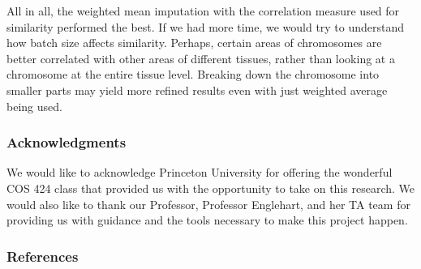 \documentclass{article} %
\begin{document}
All in all, the weighted mean imputation with the correlation measure used for similarity performed the best. If we had more time, we would try to understand how batch size affects similarity. Perhaps, certain areas of chromosomes are better correlated with other areas of different tissues, rather than looking at a chromosome at the entire tissue level. Breaking down the chromosome into smaller parts may yield more refined results even with just weighted average being used.

\subsubsection*{Acknowledgments}
We would like to acknowledge Princeton University for offering the wonderful COS 424 class that provided us with the opportunity to take on this research. We would also like to thank our Professor, Professor Englehart, and her TA team for providing us with guidance and the tools necessary to make this project happen.


\subsubsection*{References}
\end{document}
